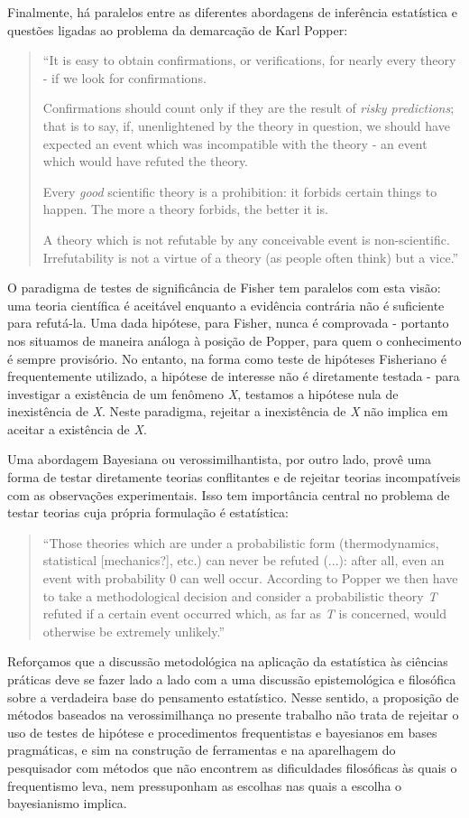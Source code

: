 Finalmente, há paralelos entre as diferentes abordagens de inferência estatística e questões ligadas ao
problema da demarcação de Karl Popper:
\begin{quote}
``It is easy to obtain confirmations, or verifications, for nearly every theory - if we look for confirmations.

Confirmations should count only if they are the result of {\em risky predictions}; that is to say, if, unenlightened by 
the theory in question, we should have expected an event which was incompatible with the theory - an 
event which would have refuted the theory.

Every {\em good} scientific theory is a prohibition: it forbids certain things to happen. The more a theory forbids, the 
better it is.

A theory which is not refutable by any conceivable event is non-scientific. Irrefutability is not a virtue of a 
theory (as people often think) but a vice.'' \citep{Popper63}
\end{quote}

O paradigma de testes de significância de Fisher tem paralelos com esta visão: uma teoria científica é 
aceitável enquanto a evidência contrária não é suficiente para refutá-la. Uma dada hipótese, para Fisher,
nunca é comprovada - portanto nos situamos de maneira análoga à posição de Popper, para quem o conhecimento
é sempre provisório. No entanto, na forma como teste de hipóteses Fisheriano é frequentemente utilizado,
a hipótese de interesse não é diretamente testada - para investigar a existência de um fenômeno {\em X},
testamos a hipótese nula de inexistência de {\em X}. Neste paradigma, rejeitar a inexistência de {\em X} 
não implica em aceitar a existência de {\em X}.

Uma abordagem Bayesiana ou verossimilhantista, por outro lado, provê uma forma de testar diretamente
teorias conflitantes e de rejeitar teorias incompatíveis com as observações experimentais.
Isso tem importância central no problema de testar teorias cuja própria formulação é estatística:

\begin{quote}
``Those theories which are under a probabilistic form (thermodynamics, statistical [mechanics?], etc.) can never be refuted (...):
after all, even an event with probability 0 can well occur. According to Popper we then have to take a methodological decision
and consider a probabilistic theory {\em T} refuted if a certain event occurred which, as far as {\em T} is concerned, would 
otherwise be extremely unlikely.'' \citep{deFinetti2010}
\end{quote}

Reforçamos que a discussão metodológica na aplicação da estatística às ciências práticas deve se fazer lado a lado
com a uma discussão
epistemológica e filosófica sobre a verdadeira base do pensamento estatístico. Nesse sentido, a proposição de
métodos baseados na verossimilhança no presente trabalho não trata de rejeitar o uso de testes de hipótese 
e procedimentos frequentistas e bayesianos em
bases pragmáticas, e sim na construção de ferramentas e na aparelhagem do pesquisador com métodos que não
encontrem as dificuldades filosóficas às quais o frequentismo leva, nem pressuponham as escolhas 
nas quais a escolha o bayesianismo implica.
